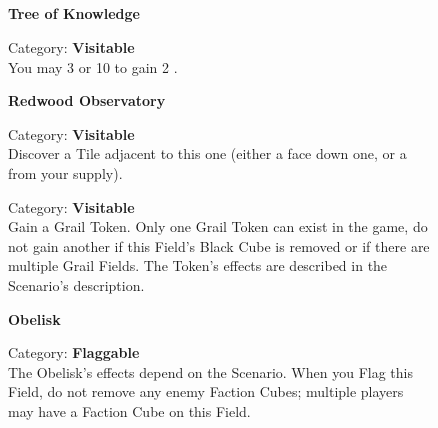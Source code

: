 
\subsection*{}

\begin{figure}[H]
  \begin{minipage}[t]{0.47\textwidth}
    \vspace{0pt}
    \centering
    \textbf{Tree of Knowledge}\par
    \caption{\small Category: \textbf{Visitable}\\You may
       3  or
       10  to gain
       2 .}
  \end{minipage}\hfill
  \begin{minipage}[t]{0.47\textwidth}
    \vspace{0pt}
    \centering
    \textbf{Redwood Observatory}\par
    \caption{\small Category: \textbf{Visitable}\\Discover a Tile adjacent to this one (either a face down one, or a \protect{} from your supply).}
  \end{minipage}
\end{figure}

\begin{figure}[H]
  \begin{minipage}[t]{0.47\textwidth}
    \vspace{0pt}
    \centering
    \phantom{j}\textbf{}\par
    \caption{\small Category: \textbf{Visitable}\\Gain a Grail Token.
    Only one Grail Token can exist in the game, do not gain another if this Field's Black Cube is removed or if there are multiple Grail Fields.
    The Token's effects are described in the Scenario's description.
    \phantom{\ldots\ldots\ldots}}
  \end{minipage}\hfill
  \begin{minipage}[t]{0.47\textwidth}
    \vspace{0pt}
    \centering
    \phantom{j}\textbf{Obelisk}\par
    \caption{\small Category: \textbf{Flaggable}\\
      The Obelisk's effects depend on the Scenario.
      When you Flag this Field, do not remove any enemy Faction Cubes; multiple players may have a Faction Cube on this Field.}
  \end{minipage}
\end{figure}

